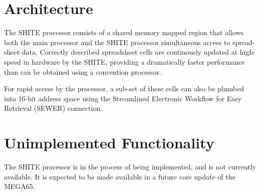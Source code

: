\section{Architecture}

The SHITE processor consists of a shared memory mapped region that
allows both the main processor and the SHITE processor simultaneous
access to spread-sheet data.  Correctly described spreadsheet cells
are continously updated at high-speed in hardware by the SHITE, providing a
dramatically faster performance than can be obtained using a
convention processor.

For rapid access by the processor, a sub-set of these cells can also
be plumbed into 16-bit address space using the Streamlined Electronic
Workflow for Easy Retrieval (SEWER) connection.

\section{Unimplemented Functionality}
The SHITE processor is in the process of being implemented, and is not
currently available. It is expected to be made available in a future
core update of the MEGA65.
